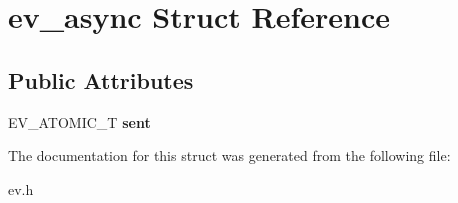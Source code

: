 \hypertarget{structev__async}{}\section{ev\+\_\+async Struct Reference}
\label{structev__async}
\subsection*{Public Attributes}
\begin{DoxyCompactItemize}
\item 
\hypertarget{structev__async_a73b397e2c5756bff1403e9273e6dbaf3}{}\label{structev__async_a73b397e2c5756bff1403e9273e6dbaf3} 
E\+V\+\_\+\+A\+T\+O\+M\+I\+C\+\_\+T {\bfseries sent}
\end{DoxyCompactItemize}


The documentation for this struct was generated from the following file\+:\begin{DoxyCompactItemize}
\item 
ev.\+h\end{DoxyCompactItemize}
